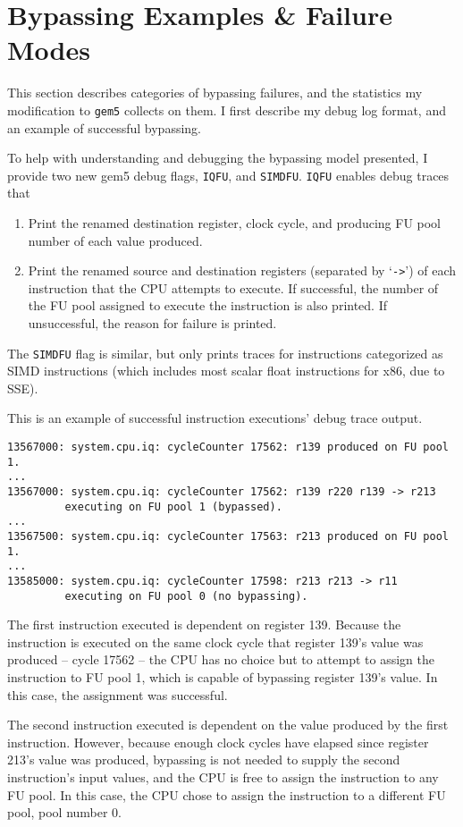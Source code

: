 \documentclass[11pt]{article}
\begin{document}
\section{Bypassing Examples \& Failure Modes}

This section describes categories of bypassing failures, and the
statistics my modification to \texttt{gem5} collects on them.
I first describe my debug log format, and an example of successful
bypassing.

To help with understanding and debugging the bypassing model
presented, I provide two new gem5 debug flags, \texttt{IQFU}, and
\texttt{SIMDFU}. \texttt{IQFU} enables debug traces that
\begin{enumerate}
\item Print the renamed destination register, clock cycle, and
  producing FU pool number of each value produced.
\item Print the renamed source and destination registers (separated
  by `\texttt{->}') of each instruction that the CPU attempts to
  execute. If successful, the number of the FU pool assigned to
  execute the instruction is also printed. If unsuccessful, the
  reason for failure is printed.
\end{enumerate}
The \texttt{SIMDFU} flag is similar, but only prints traces for
instructions categorized as SIMD instructions (which includes most
scalar float instructions for x86, due to SSE).

This is an example of successful instruction executions' debug trace
output.
\begin{verbatim}
13567000: system.cpu.iq: cycleCounter 17562: r139 produced on FU pool 1.
...
13567000: system.cpu.iq: cycleCounter 17562: r139 r220 r139 -> r213
         executing on FU pool 1 (bypassed).
...
13567500: system.cpu.iq: cycleCounter 17563: r213 produced on FU pool 1.
...
13585000: system.cpu.iq: cycleCounter 17598: r213 r213 -> r11
         executing on FU pool 0 (no bypassing).
\end{verbatim}
The first instruction executed is dependent on register 139. Because
the instruction is executed on the same clock cycle that register
139's value was produced -- cycle 17562 -- the CPU has no choice but
to attempt to assign the instruction to FU pool 1, which is capable of
bypassing register 139's value. In this case, the assignment was
successful.

The second instruction executed is dependent on the value produced by
the first instruction. However, because enough clock cycles have
elapsed since register 213's value was produced, bypassing is not
needed to supply the second instruction's input values, and the CPU is
free to assign the instruction to any FU pool. In this case, the CPU
chose to assign the instruction to a different FU pool, pool number 0.
\end{document}
